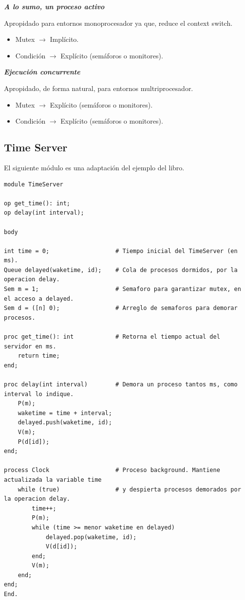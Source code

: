 \documentclass[a4paper, 10pt]{report}
\begin{document}
\begin{multicols}{2}
\centerline{\textbf{\emph{A lo sumo, un proceso activo}}}

\centering
Apropidado para entornos monoprocesador ya que, reduce el context switch.

\begin{itemize}
    \item Mutex $\rightarrow$ Implícito.
    \item Condición $\rightarrow$ Explícito (semáforos o monitores).
\end{itemize}

\columnbreak
\centerline{\textbf{\emph{Ejecución concurrente}}}

Apropidado, de forma natural, para entornos multriprocesador.

\begin{itemize}
    \item Mutex $\rightarrow$ Explícito (semáforos o monitores).
    \item Condición $\rightarrow$ Explícito (semáforos o monitores).
\end{itemize}

\end{multicols}

\subsection{Time Server}

El siguiente módulo es una adaptación del ejemplo del libro.

\begin{lstlisting}
module TimeServer

op get_time(): int;
op delay(int interval);

body

int time = 0;                   # Tiempo inicial del TimeServer (en ms).
Queue delayed(waketime, id);    # Cola de procesos dormidos, por la operacion delay.
Sem m = 1;                      # Semaforo para garantizar mutex, en el acceso a delayed.
Sem d = ([n] 0);                # Arreglo de semaforos para demorar procesos.

proc get_time(): int            # Retorna el tiempo actual del servidor en ms.
    return time;
end;

proc delay(int interval)        # Demora un proceso tantos ms, como interval lo indique.
    P(m);
    waketime = time + interval;
    delayed.push(waketime, id);
    V(m);
    P(d[id]);
end;

process Clock                   # Proceso background. Mantiene actualizada la variable time
    while (true)                # y despierta procesos demorados por la operacion delay.
        time++;                 
        P(m);
        while (time >= menor waketime en delayed)
            delayed.pop(waketime, id);
            V(d[id]);
        end;
        V(m);
    end;
end;
End.
\end{lstlisting}
\end{document}
